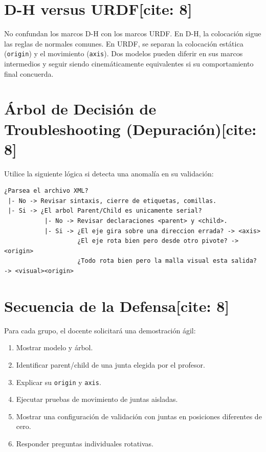 \documentclass[11pt, a4paper]{article}
\begin{document}
\section{D-H versus URDF[cite: 8]}
No confundan los marcos D-H con los marcos URDF. En D-H, la colocación sigue las reglas de normales comunes. En URDF, se separan la colocación estática (\texttt{origin}) y el movimiento (\texttt{axis}). Dos modelos pueden diferir en sus marcos intermedios y seguir siendo cinemáticamente equivalentes si su comportamiento final concuerda.

\section{Árbol de Decisión de Troubleshooting (Depuración)[cite: 8]}
Utilice la siguiente lógica si detecta una anomalía en su validación:
\begin{lstlisting}[style=xmlstyle, backgroundcolor=\color{white}]
¿Parsea el archivo XML?
 |- No -> Revisar sintaxis, cierre de etiquetas, comillas.
 |- Si -> ¿El arbol Parent/Child es unicamente serial?
           |- No -> Revisar declaraciones <parent> y <child>.
           |- Si -> ¿El eje gira sobre una direccion errada? -> <axis>
                    ¿El eje rota bien pero desde otro pivote? -> <origin>
                    ¿Todo rota bien pero la malla visual esta salida? -> <visual><origin>
\end{lstlisting}

\section{Secuencia de la Defensa[cite: 8]}
Para cada grupo, el docente solicitará una demostración ágil:
\begin{enumerate}
    \item Mostrar modelo y árbol.
    \item Identificar parent/child de una junta elegida por el profesor.
    \item Explicar su \texttt{origin} y \texttt{axis}.
    \item Ejecutar pruebas de movimiento de juntas aisladas.
    \item Mostrar una configuración de validación con juntas en posiciones diferentes de cero.
    \item Responder preguntas individuales rotativas.
\end{enumerate}
\end{document}
